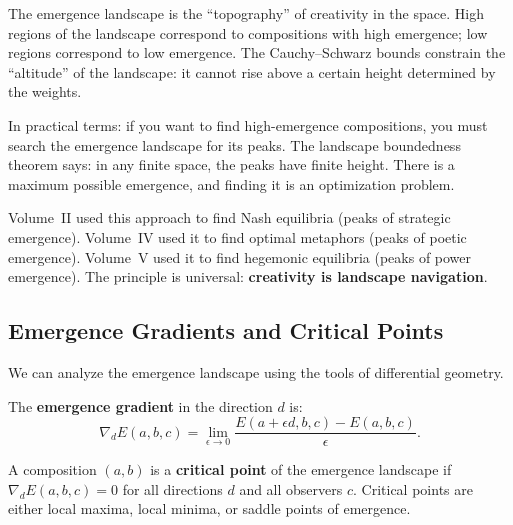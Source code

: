 \begin{interpretation}
The emergence landscape is the ``topography'' of creativity in the space. High
regions of the landscape correspond to compositions with high emergence; low
regions correspond to low emergence. The Cauchy--Schwarz bounds constrain the
``altitude'' of the landscape: it cannot rise above a certain height determined
by the weights.

In practical terms: if you want to find high-emergence compositions, you must
search the emergence landscape for its peaks. The landscape boundedness theorem
says: in any finite space, the peaks have finite height. There is a maximum
possible emergence, and finding it is an optimization problem.

Volume~II used this approach to find Nash equilibria (peaks of strategic
emergence). Volume~IV used it to find optimal metaphors (peaks of poetic
emergence). Volume~V used it to find hegemonic equilibria (peaks of power
emergence). The principle is universal: \textbf{creativity is landscape
navigation}.
\end{interpretation}

\subsection{Emergence Gradients and Critical Points}

We can analyze the emergence landscape using the tools of differential geometry.

\begin{definition}
\label{def:emergence-gradient}
The \textbf{emergence gradient} in the direction $d$ is:
\[
  \nabla_d E(a, b, c) = \lim_{\epsilon \to 0} \frac{E(a + \epsilon d, b, c) - E(a, b, c)}{\epsilon}.
\]
\end{definition}

\begin{theorem}
\label{thm:critical-points}
A composition $(a, b)$ is a \textbf{critical point} of the emergence landscape
if $\nabla_d E(a, b, c) = 0$ for all directions $d$ and all observers $c$.
Critical points are either local maxima, local minima, or saddle points of
emergence.
\end{theorem}

